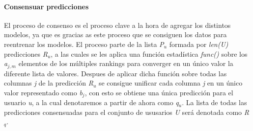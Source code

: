 \paragraph{Consensuar predicciones} El proceso de consenso es el proceso clave a la hora de agregar los distintos modelos, ya que es gracias as este proceso que se consiguen los datos para reentrenar los modelos. El proceso parte de la lista \textit{P$_{u}$} formada por \textit{len(U)} predicciones \textit{R$_{u}$}, a las cuales se les aplica una función estadística \textit{func()} sobre los \textit{a$_{j, m}$} elementos de los múltiples rankings para converger en un único valor la diferente lista de valores. Despues de aplicar dicha función sobre todas las columnas \textit{j} de la predicción \textit{R$_{u}$} se consigue unificar cada columna \textit{j} en un único valor representado como \textit{b$_{j}$}, con esto se obtiene una única predicción para el usuario \textit{u}, a la cual denotaremos a partir de ahora como \textit{q$_{u}$}. La lista de todas las predicciones consensuadas para el conjunto de ususarios \textit{U} será denotada como \textit{R$_{q}$}.

